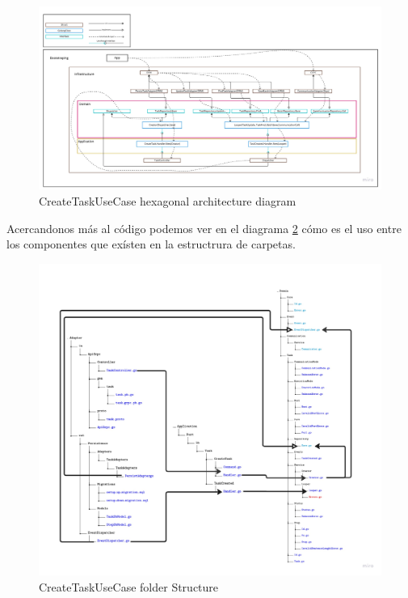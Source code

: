 \begin{figure}[H]
    \centering
    \includegraphics[height=0.3\textheight]{./part/Ejecucion/Seguimiento/CreateTaskUseCase/img/createTaskUseCaseArchitecture}
    \caption{CreateTaskUseCase hexagonal architecture diagram}\label{fig:createTaskUseCaseArchitecture}
\end{figure}

Acercandonos más al código podemos ver en el diagrama \ref{fig:createTaskUseCaseArchitectureFolderStructure} cómo es el uso entre los componentes que exísten en la estructrura de carpetas.

\begin{figure}[H]
    \centering
    \includegraphics[height=0.5\textheight]{./part/Ejecucion/Seguimiento/CreateTaskUseCase/img/PFM - CreateUseCaseFolderStructure}
    \caption{CreateTaskUseCase folder Structure}\label{fig:createTaskUseCaseArchitectureFolderStructure}
\end{figure}

